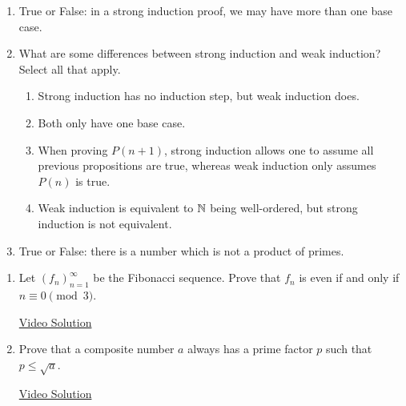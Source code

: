 \pagestyle{empty}


\begin{enumerate}
	\item True or False: in a strong induction proof, we may have more than one base case.

\item What are some differences between strong induction and weak induction? Select all that apply.
\begin{enumerate}
    \item Strong induction has no induction step, but weak induction does.
    \item Both only have one base case.
    \item When proving $P(n+1)$, strong induction allows one to assume all previous propositions are true, whereas weak induction only assumes $P(n)$ is true.
    \item Weak induction is equivalent to $\mathbb{N}$ being well-ordered, but strong induction is not equivalent.
\end{enumerate}

\item True or False: there is a number which is not a product of primes.
\end{enumerate}



\begin{enumerate}
\item Let $(f_n)_{n=1}^\infty$ be the Fibonacci sequence. Prove that $f_n$ is even if and only if $n \equiv 0 \pmod 3$.

\href{https://youtu.be/QqCvIcfTwDo}{Video Solution}

\item Prove that a composite number $a$ always has a prime factor $p$ such that $p \leq \sqrt{a}$.

\href{https://youtu.be/csZ-xYraPL0}{Video Solution}
\end{enumerate}


